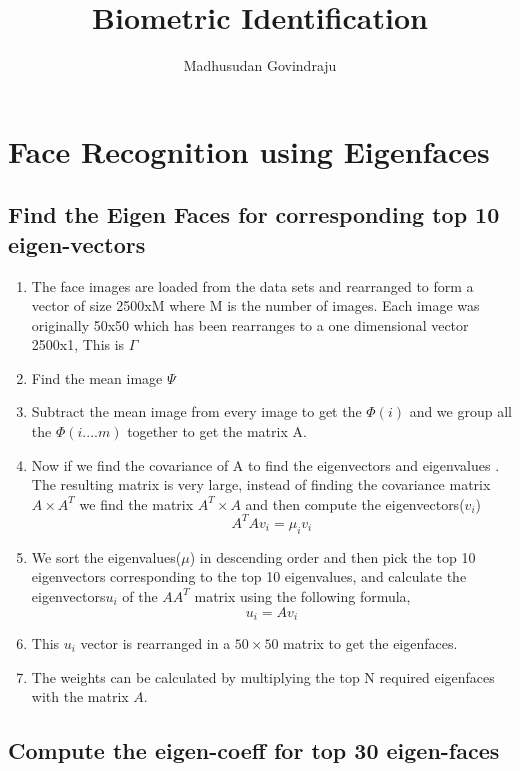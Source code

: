 \documentclass[10pt, letterpaper]{article}
\author{Madhusudan Govindraju}
\date{}
\begin{document}
\title{Biometric Identification}
\maketitle

\section{Face Recognition using Eigenfaces}


\subsection{Find the Eigen Faces for corresponding top 10 eigen-vectors}
\begin{enumerate}
\item The face images are loaded from the data sets and rearranged to form a vector of size 2500xM where M is the number of images. Each image was originally 50x50 which has been rearranges to a one dimensional vector 2500x1, This is $\Gamma$
\item Find the mean image $\Psi$
\item Subtract the mean image from every image to get the $\Phi(i)$ and we group all the $\Phi(i....m)$ together to get the matrix A.
\item Now if we find the covariance of A to find the eigenvectors and eigenvalues . The resulting matrix is very large, instead of finding the covariance matrix $ A \times A^{T} $ we find the matrix $ A^{T}\times A $ and  then compute the eigenvectors($v_{i}$) 
$$
        A^{T}Av_{i} = \mu_{i}v_{i}	
$$
\item We sort the eigenvalues($\mu$) in descending order and then pick the top 10 eigenvectors corresponding to the top 10 eigenvalues, and calculate the eigenvectors$u_{i}$ of the $AA^{T}$ matrix using the following formula,
$$
u_{i} = Av_{i}
$$
\item This $u_{i}$ vector is rearranged in a $50\times50$ matrix to get the eigenfaces. 
\item The weights can be calculated by multiplying the top N required eigenfaces with the matrix $A$.
\end{enumerate}

\subsection{Compute the eigen-coeff for top 30 eigen-faces}
\end{document}
